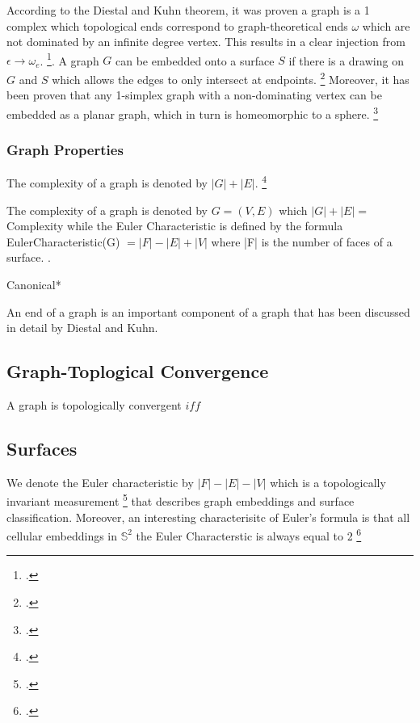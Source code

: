 According to the Diestal and Kuhn theorem, it was proven a graph is a 1 complex which topological ends correspond to graph-theoretical ends $\omega$  which are not dominated by an infinite degree vertex. This results in a clear injection from $\epsilon \rightarrow \omega_{e}$. \footcite{Kuhn2002}. A graph $G$ can be embedded onto a surface $S$ if there is a drawing on $G$ and $S$ which allows the edges to only intersect at endpoints. \footcite{Childs2016}  Moreover, it has been proven that any 1-simplex graph with a non-dominating vertex can be embedded as a planar graph, which in turn is homeomorphic to a sphere. \footcite{Childs2016}

\subsubsection{Graph Properties}

\begin{definition}
  The complexity of a graph is denoted by $|G| + |E|$. \footcite{Verdiere2016}
\end{definition}



The complexity of a graph is denoted by $G = (V,E)$ which $|G| + |E| = $ Complexity  \cite{Verdiere2016} while the Euler Characteristic is defined  by the formula EulerCharacteristic(G) $= |F| - |E| + |V|$ where |F| is the number of faces of a surface. \cite{Childs2016}.

Canonical*

An end of a graph is an important component of a graph that has been discussed in detail by Diestal and Kuhn. 


\subsection{Graph-Toplogical Convergence}
\begin{proposition}
A graph is topologically convergent $iff$ 
\end{proposition}


\subsection{Surfaces}

\begin{definition}
  We denote the Euler characteristic by $|F| - |E| - |V|$ which is a topologically invariant measurement \footcite{Childs2016} that describes graph embeddings and surface classification. Moreover, an interesting characterisitc of Euler's formula is that all cellular embeddings in $\mathbb{S}^2$ the Euler Characterstic is always equal to 2 \footcite{Childs2016}
 \end{definition}

